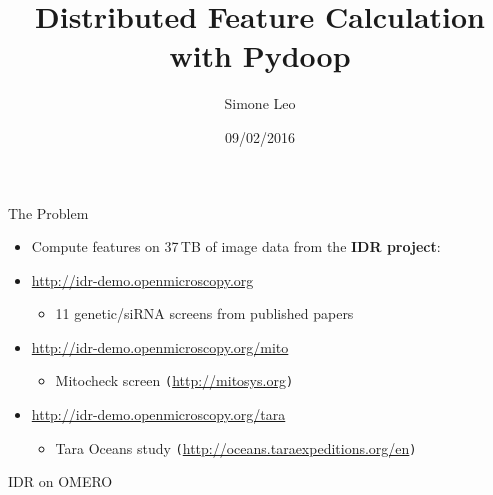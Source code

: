 \documentclass[compress]{beamer}
\institute{
OME Tuesday Meeting
}
\title{Distributed Feature Calculation with Pydoop}
\author{Simone Leo}
\date{09/02/2016}
\newcommand{\urlref}[1]{{\small \texttt{(}{\color{blue}\url{#1}}\texttt{)}}}
\begin{document}
\begin{frame}[plain]
  \titlepage{}
\end{frame}




\begin{frame}{The Problem}
\begin{center}
  \begin{itemize}
  \item Compute features on 37\,TB of image data from the {\bfseries
    IDR project}:
  \item \url{http://idr-demo.openmicroscopy.org}
    \begin{itemize}
    \item 11 genetic/siRNA screens from published papers
    \end{itemize}
  \item \url{http://idr-demo.openmicroscopy.org/mito}
    \begin{itemize}
    \item Mitocheck screen \urlref{http://mitosys.org}
    \end{itemize}
  \item \url{http://idr-demo.openmicroscopy.org/tara}
    \begin{itemize}
    \item Tara Oceans study \urlref{http://oceans.taraexpeditions.org/en}
    \end{itemize}
  \end{itemize}
\end{center}
\end{frame}

\begin{frame}{IDR on OMERO}
  \begin{center}
 \end{center}
\end{frame}
\end{document}
